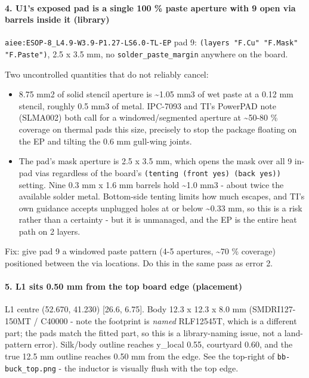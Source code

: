 \documentclass[11pt,a4paper]{article}
\begin{document}
\paragraph*{4. U1's exposed pad is a single 100 \% paste aperture with 9 open via barrels inside it (library)}
\texttt{aiee:ESOP-8\_L4.9-W3.9-P1.27-LS6.0-TL-EP} pad 9: \texttt{(layers "F.Cu" "F.Mask" "F.Paste")}, 2.5 x 3.5 mm, no \texttt{solder\_paste\_margin} anywhere on the board.

Two uncontrolled quantities that do not reliably cancel:

\begin{itemize}
\item 8.75 mm2 of solid stencil aperture is \textasciitilde{}1.05 mm3 of wet paste at a 0.12 mm stencil,
roughly 0.5 mm3 of metal. IPC-7093 and TI's PowerPAD note (SLMA002) both call for a
windowed/segmented aperture at \textasciitilde{}50-80 \% coverage on thermal pads this size,
precisely to stop the package floating on the EP and tilting the 0.6 mm gull-wing
joints.
\item The pad's mask aperture is 2.5 x 3.5 mm, which opens the mask over all 9 in-pad
vias regardless of the board's \texttt{(tenting (front yes) (back yes))} setting. Nine
0.3 mm x 1.6 mm barrels hold \textasciitilde{}1.0 mm3 - about twice the available solder metal.
Bottom-side tenting limits how much escapes, and TI's own guidance accepts
unplugged holes at or below \textasciitilde{}0.33 mm, so this is a risk rather than a certainty -
but it is unmanaged, and the EP is the entire heat path on 2 layers.
\end{itemize}
Fix: give pad 9 a windowed paste pattern (4-5 apertures, \textasciitilde{}70 \% coverage) positioned between the via locations. Do this in the same pass as error 2.

\paragraph*{5. L1 sits 0.50 mm from the top board edge (placement)}
L1 centre (52.670, 41.230) {[}26.6, 6.75{]}. Body 12.3 x 12.3 x 8.0 mm (SMDRI127-150MT / C40000 - note the footprint is \emph{named} RLF12545T, which is a different part; the pads match the fitted part, so this is a library-naming issue, not a land-pattern error). Silk/body outline reaches y\_local 0.55, courtyard 0.60, and the true 12.5 mm outline reaches 0.50 mm from the edge. See the top-right of \texttt{bb-buck\_top.png} - the inductor is visually flush with the top edge.
\end{document}
